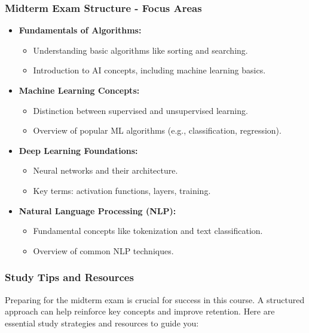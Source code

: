 \documentclass[aspectratio=169]{beamer}
\begin{document}
\begin{frame}[fragile]
    \frametitle{Midterm Exam Structure - Focus Areas}
    \begin{itemize}
        \item \textbf{Fundamentals of Algorithms:}
            \begin{itemize}
                \item Understanding basic algorithms like sorting and searching.
                \item Introduction to AI concepts, including machine learning basics.
            \end{itemize}
            
        \item \textbf{Machine Learning Concepts:}
            \begin{itemize}
                \item Distinction between supervised and unsupervised learning.
                \item Overview of popular ML algorithms (e.g., classification, regression).
            \end{itemize}
        
        \item \textbf{Deep Learning Foundations:}
            \begin{itemize}
                \item Neural networks and their architecture.
                \item Key terms: activation functions, layers, training.
            \end{itemize}

        \item \textbf{Natural Language Processing (NLP):}
            \begin{itemize}
                \item Fundamental concepts like tokenization and text classification.
                \item Overview of common NLP techniques.
            \end{itemize}
    \end{itemize}
\end{frame}

\begin{frame}[fragile]
    \frametitle{Study Tips and Resources}
    
    Preparing for the midterm exam is crucial for success in this course. 
    A structured approach can help reinforce key concepts and improve retention. 
    Here are essential study strategies and resources to guide you:
\end{frame}
\end{document}
